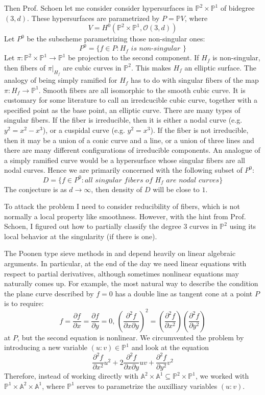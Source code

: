 \documentclass[12pt]{article}
\theoremstyle{plain}
\theoremstyle{definition}
\newcommand{\IA}{\mathbb{A}}
\newcommand{\IP}{\mathbb{P}}
\newcommand{\sO}{\mathcal{O}}
\newcommand{\<}{\langle}
\renewcommand{\>}{\rangle}
\newcommand{\p}{\partial}
\begin{document}
Then Prof. Schoen let me consider consider hypersurfaces in $\IP^2 \times \IP^1$ of bidegree $(3, d)$. These hypersurfaces are parametrized by $P = \IP V$, where
$$ V = H^0 ( \IP^2 \times \IP^1, \sO(3, d) ) $$
Let $P^0$ be the subscheme parametrizing those non-singular ones:
$$ P^0 = \{ f \in P : H_f \textit{ is non-singular }\} $$
Let $\pi : \IP^2 \times \IP^1 \to \IP^1$ be projection to the second component. If $H_f$ is non-singular, then fibers of $\pi|_{H_f}$ are cubic curves in $\IP^2$. This makes $H_f$ an elliptic surface. The analogy of being simply ramified for $H_f$ has to do with singular fibers of the map $\pi : H_f \to \IP^1$. Smooth fibers are all isomorphic to the smooth cubic curve. It is customary for some literature to call an irredcucible cubic curve, together with a specified point as the base point, an elliptic curve. There are many types of singular fibers. If the fiber is irreducible, then it is either a nodal curve (e.g. $y^2 = x^2 - x^3$), or a cuspidal curve (e.g. $y^2 = x^3$). If the fiber is not irreducible, then it may be a union of a conic curve and a line, or a union of three lines and there are many different configurations of irreducible components. 
An analogue of a simply ramified curve would be a hypersurface whose singular fibers are all nodal curves. Hence we are primarily concerned with the following subset of $P^0$: 
$$ D = \{ f \in P^0 : \textit{all singular fibers of $H_f$ are nodal curves} \}$$
The conjecture is as $d \to \infty$, then density of $D$ will be close to $1$. 

To attack the problem I need to consider reducibility of fibers, which is not normally a local property like smoothness. However, with the hint from Prof. Schoen, I figured out how to partially classify the degree 3 curves in $\IP^2$ using its local behavior at the singularity (if there is one). 

The Poonen type sieve methods in \cite{Poonen} and \cite{Wood} depend heavily on linear algebraic arguments. In particular, at the end of the day we need linear equations with respect to partial derivatives, although sometimes nonlinear equations may naturally comes up. For example, the most natural way to describe the condition the plane curve described by $f = 0$ has a double line as tangent cone at a point $P$ is to require:
$$f = \frac{\p f}{\p x} = \frac{\p f}{\p y} = 0,\, (\frac{\p^2 f}{\p x \p y})^2 = (\frac{\p^2 f}{\p x^2})(\frac{\p^2 f}{\p y^2})$$ at $P$, but the second equation is 
nonlinear. We circumvented the problem by introducing a new variable $(u : v) \in \IP^1$ and look at the equation
$$ \frac{\p^2 f}{\p x^2} u^2 + 2 \frac{\p^2 f}{\p x \p y} uv + \frac{\p^2 f}{\p y^2} v^2 $$ Therefore, instead of working directly with $\IA^2 \times \IA^1 \subseteq \IP^2 \times \IP^1$, we worked with $\IP^1 \times \IA^2 \times \IA^1$, where $\IP^1$ serves to parametrize the auxilliary variables $(u : v)$. 
\end{document}
